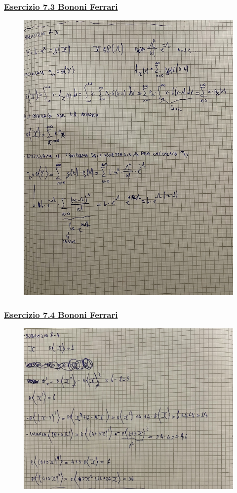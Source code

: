 \documentclass{article}
\begin{document}
\subsubsection{\underline{Esercizio 7.3 Bononi Ferrari}}
\begin{figure}[H]
\centering
\includegraphics[scale=0.10]{ese/35.jpeg}
\end{figure}
\subsubsection{\underline{Esercizio 7.4 Bononi Ferrari}}
\begin{figure}[H]
\centering
\includegraphics[scale=0.10]{ese/36.jpeg}
\end{figure}
\end{document}

